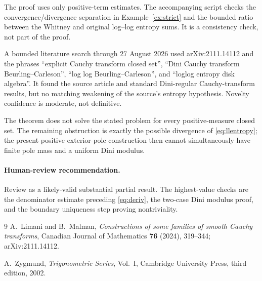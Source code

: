 \documentclass[11pt]{article}
\begin{document}
The proof uses only positive-term estimates.  The accompanying script checks
the convergence/divergence separation in Example~\ref{ex:strict} and the
bounded ratio between the Whitney and original log--log entropy sums.  It is
a consistency check, not part of the proof.

A bounded literature search through 27 August 2026 used arXiv:2111.14112 and
the phrases ``explicit Cauchy transform closed set'', ``Dini Cauchy transform
Beurling--Carleson'', ``log log Beurling--Carleson'', and ``loglog entropy
disk algebra''.  It found the source article and standard Dini-regular
Cauchy-transform results, but no matching weakening of the source's entropy
hypothesis.  Novelty confidence is moderate, not definitive.

The theorem does not solve the stated problem for every positive-measure
closed set.  The remaining obstruction is exactly the possible divergence
of \eqref{eq:llentropy}; the present positive exterior-pole construction then
cannot simultaneously have finite pole mass and a uniform Dini modulus.

\paragraph{Human-review recommendation.}
Review as a likely-valid substantial partial result.  The highest-value
checks are the denominator estimate preceding \eqref{eq:deriv}, the two-case
Dini modulus proof, and the boundary uniqueness step proving nontriviality.

\begin{thebibliography}{9}
A.~Limani and B.~Malman,
\emph{Constructions of some families of smooth Cauchy transforms},
Canadian Journal of Mathematics \textbf{76} (2024), 319--344;
arXiv:2111.14112.

A.~Zygmund,
\emph{Trigonometric Series}, Vol.~I,
Cambridge University Press, third edition, 2002.
\end{thebibliography}
\end{document}
